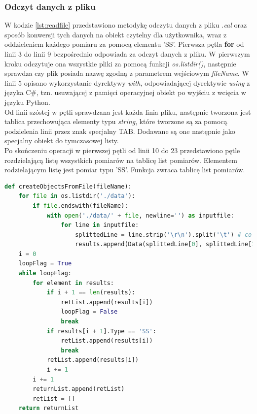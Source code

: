 \subsubsection{Odczyt danych z pliku}
\label{sssec:readfile}
W kodzie \ref{lst:readfile} przedstawiono metodykę odczytu danych z pliku \emph{.cal} oraz sposób konwersji tych danych na obiekt czytelny dla użytkownika, wraz z oddzieleniem każdego pomiaru za pomocą elementu 'SS'. Pierwsza pętla \textbf{for} od linii 3 do linii 9 bezpośrednio odpowiada za odczyt danych z pliku. W pierwszym kroku odczytuje ona wszystkie pliki za pomocą funkcji \emph{os.listdir()}, następnie sprawdza czy plik posiada nazwę zgodną z parametrem wejściowym \emph{fileName}. W linii 5 opisano wykorzystanie dyrektywy \emph{with}, odpowiadającej dyrektywie \emph{using} z języka C\#, tzn. usuwającej z pamięci operacyjnej obiekt po wyjściu z wcięcia w języku Python.\\
Od linii szóstej w pętli sprawdzana jest każda linia pliku, następnie tworzona jest tablica przechowująca elementy typu \emph{string}, które tworzone są za pomocą podzielenia linii przez znak specjalny TAB. Dodawane są one następnie jako specjalny obiekt do tymczasowej listy.\\
Po skończeniu operacji w pierwszej pętli od linii 10 do 23 przedstawiono pętle rozdzielającą listę wszystkich pomiarów na tablicę list pomiarów. Elementem rodzielającym listę jest pomiar typu 'SS'. Funkcja zwraca tablicę list pomiarów.
\begin{lstlisting}[language=Python, caption=Odczyt i tworzenie danych z pliku, label={lst:readfile}]
def createObjectsFromFile(fileName):
    for file in os.listdir('./data'):
        if file.endswith(fileName):
            with open('./data/' + file, newline='') as inputfile:
                for line in inputfile:
                    splittedLine = line.strip('\r\n').split('\t') # co linię, oddziel o znak tab
                    results.append(Data(splittedLine[0], splittedLine[1], splittedLine[2], splittedLine[3]))
    i = 0
    loopFlag = True
    while loopFlag:
        for element in results:
            if i + 1 == len(results):
                retList.append(results[i])
                loopFlag = False
                break
            if results[i + 1].Type == 'SS':
                retList.append(results[i])
                break
            retList.append(results[i])
            i += 1
        i += 1
        returnList.append(retList)
        retList = []
    return returnList
\end{lstlisting}
